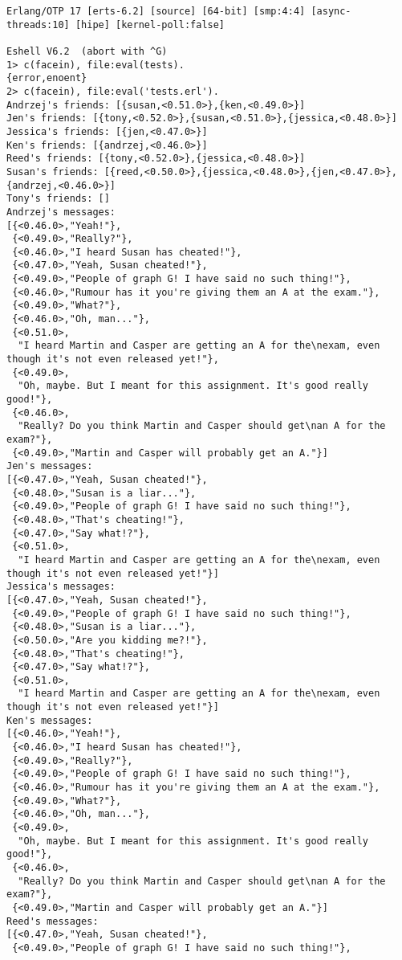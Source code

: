 \begin{verbatim}
Erlang/OTP 17 [erts-6.2] [source] [64-bit] [smp:4:4] [async-threads:10] [hipe] [kernel-poll:false]

Eshell V6.2  (abort with ^G)
1> c(facein), file:eval(tests).
{error,enoent}
2> c(facein), file:eval('tests.erl').
Andrzej's friends: [{susan,<0.51.0>},{ken,<0.49.0>}]
Jen's friends: [{tony,<0.52.0>},{susan,<0.51.0>},{jessica,<0.48.0>}]
Jessica's friends: [{jen,<0.47.0>}]
Ken's friends: [{andrzej,<0.46.0>}]
Reed's friends: [{tony,<0.52.0>},{jessica,<0.48.0>}]
Susan's friends: [{reed,<0.50.0>},{jessica,<0.48.0>},{jen,<0.47.0>},{andrzej,<0.46.0>}]
Tony's friends: []
Andrzej's messages:
[{<0.46.0>,"Yeah!"},
 {<0.49.0>,"Really?"},
 {<0.46.0>,"I heard Susan has cheated!"},
 {<0.47.0>,"Yeah, Susan cheated!"},
 {<0.49.0>,"People of graph G! I have said no such thing!"},
 {<0.46.0>,"Rumour has it you're giving them an A at the exam."},
 {<0.49.0>,"What?"},
 {<0.46.0>,"Oh, man..."},
 {<0.51.0>,
  "I heard Martin and Casper are getting an A for the\nexam, even though it's not even released yet!"},
 {<0.49.0>,
  "Oh, maybe. But I meant for this assignment. It's good really good!"},
 {<0.46.0>,
  "Really? Do you think Martin and Casper should get\nan A for the exam?"},
 {<0.49.0>,"Martin and Casper will probably get an A."}]
Jen's messages:
[{<0.47.0>,"Yeah, Susan cheated!"},
 {<0.48.0>,"Susan is a liar..."},
 {<0.49.0>,"People of graph G! I have said no such thing!"},
 {<0.48.0>,"That's cheating!"},
 {<0.47.0>,"Say what!?"},
 {<0.51.0>,
  "I heard Martin and Casper are getting an A for the\nexam, even though it's not even released yet!"}]
Jessica's messages:
[{<0.47.0>,"Yeah, Susan cheated!"},
 {<0.49.0>,"People of graph G! I have said no such thing!"},
 {<0.48.0>,"Susan is a liar..."},
 {<0.50.0>,"Are you kidding me?!"},
 {<0.48.0>,"That's cheating!"},
 {<0.47.0>,"Say what!?"},
 {<0.51.0>,
  "I heard Martin and Casper are getting an A for the\nexam, even though it's not even released yet!"}]
Ken's messages:
[{<0.46.0>,"Yeah!"},
 {<0.46.0>,"I heard Susan has cheated!"},
 {<0.49.0>,"Really?"},
 {<0.49.0>,"People of graph G! I have said no such thing!"},
 {<0.46.0>,"Rumour has it you're giving them an A at the exam."},
 {<0.49.0>,"What?"},
 {<0.46.0>,"Oh, man..."},
 {<0.49.0>,
  "Oh, maybe. But I meant for this assignment. It's good really good!"},
 {<0.46.0>,
  "Really? Do you think Martin and Casper should get\nan A for the exam?"},
 {<0.49.0>,"Martin and Casper will probably get an A."}]
Reed's messages:
[{<0.47.0>,"Yeah, Susan cheated!"},
 {<0.49.0>,"People of graph G! I have said no such thing!"},

\end{verbatim}
